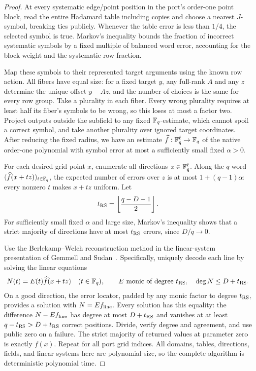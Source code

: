 \begin{proof}
At every systematic edge/point position in the port's order-one
point block, read the entire Hadamard table including copies and
choose a nearest \(J\)-symbol, breaking ties publicly.  Whenever
the table error is less than \(1/4\), the selected symbol is true.
Markov's inequality bounds the fraction of incorrect systematic
symbols by a fixed multiple of balanced word error, accounting for
the block weight and the systematic row fraction.

Map these symbols to their represented target arguments using the
known row action.  All fibers have equal size: for a fixed target
\(y\), any full-rank \(A\) and any \(z\) determine the unique
offset \(y-Az\), and the number of choices is the same for every
row group.  Take a plurality in each fiber.  Every wrong plurality
requires at least half its fiber's symbols to be wrong, so this
loses at most a factor two.  Project outputs outside the subfield
to any fixed \(\mathbb{F}_q\)-estimate, which cannot spoil a correct
symbol, and take another plurality over ignored target coordinates.
After reducing the fixed radius, we have an estimate
\(\widehat f:\mathbb{F}_q^\ell\to\mathbb{F}_q\) of the native order-one
polynomial with symbol error at most a sufficiently small fixed
\(\alpha>0\).

For each desired grid point \(x\), enumerate all directions
\(z\in\mathbb{F}_q^\ell\).  Along the \(q\)-word
\((\widehat f(x+tz))_{t\in\mathbb{F}_q}\), the expected number of
errors over \(z\) is at most
\(1+(q-1)\alpha\): every nonzero \(t\) makes \(x+tz\) uniform.
Let
\[
 t_{\rm RS}=\left\lfloor\frac{q-D-1}{2}\right\rfloor.
\]
For sufficiently small fixed \(\alpha\) and large size, Markov's
inequality shows that a strict majority of directions have at most
\(t_{\rm RS}\) errors, since \(D/q\to0\).

Use the Berlekamp--Welch reconstruction method in the linear-system
presentation of Gemmell and Sudan~\cite[Appendix~A]{GemmellSudan1992}.
Specifically, uniquely decode each line by solving the linear equations
\[
 N(t)=E(t)\widehat f(x+tz)\quad(t\in\mathbb{F}_q),\qquad
 E\text{ monic of degree }t_{\rm RS},\quad
 \deg N\le D+t_{\rm RS}.
\]
On a good direction, the error locator, padded by any monic factor
to degree \(t_{\rm RS}\), provides a solution with
\(N=Ef_{\rm line}\).  Every solution has this equality: the
difference \(N-Ef_{\rm line}\) has degree at most
\(D+t_{\rm RS}\) and vanishes at at least
\(q-t_{\rm RS}>D+t_{\rm RS}\) correct positions.
Divide, verify degree and agreement, and use public zero on a
failure.  The strict majority of returned values at parameter zero
is exactly \(f(x)\).  Repeat for all port grid indices.
All domains, tables, directions, fields, and linear systems here
are polynomial-size, so the complete algorithm is deterministic
polynomial time.
\end{proof}

